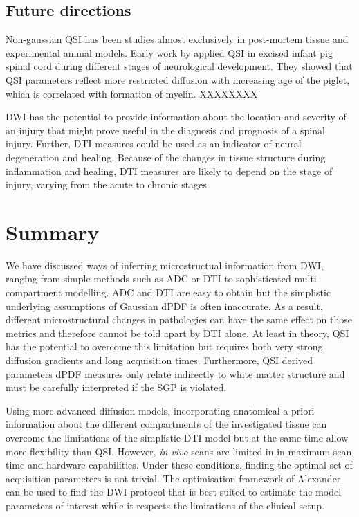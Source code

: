 \subsection{Future directions}
Non-gaussian \gls{QSI} has been studies almost exclusively in post-mortem tissue and experimental animal models. Early work by \citet{Assaf:2001} applied \gls{QSI} in excised infant pig spinal cord during different stages of neurological development. They showed that \gls{QSI} parameters reflect more restricted diffusion with increasing age of the piglet, which is correlated with formation of myelin. XXXXXXXX


\Gls{DWI} has the potential to  provide information about the location and severity of an injury that might prove useful in the diagnosis and prognosis of a spinal injury.  Further, DTI measures could be used as an indicator of neural degeneration and healing.  Because of the changes in tissue structure during inflammation and healing, DTI measures are likely to depend on the stage of injury, varying from the acute to chronic stages.  

 
\section{Summary}
We have discussed ways of inferring microstructual information from  {\gls{DWI}}, ranging from simple methods such as \gls{ADC} or \gls{DTI} to sophisticated multi-compartment modelling. \gls{ADC} and \gls{DTI} are easy to obtain but the simplistic underlying assumptions of Gaussian  {\gls{dPDF}} is often inaccurate. As a result, different microstructural changes in pathologies can have the same effect on those metrics and therefore cannot be told apart by \gls{DTI} alone. At least in theory, \gls{QSI} has the potential to overcome this limitation but requires both very strong diffusion gradients and long acquisition times. Furthermore, \gls{QSI} derived parameters  {\gls{dPDF}} measures only relate indirectly to white matter structure and must be carefully interpreted if the SGP is violated.


Using more advanced diffusion models, incorporating anatomical a-priori information about the different compartments of the investigated tissue can overcome the limitations of the simplistic \gls{DTI} model but at the same time allow more flexibility than \gls{QSI}. However, \emph{in-vivo} scans are limited in in maximum scan time and hardware capabilities. Under these conditions, finding the optimal set of acquisition parameters is not trivial. The optimisation framework of Alexander can be used to find the  {\gls{DWI}}  protocol that is best suited to estimate the model parameters of interest while it respects the limitations of the clinical setup.  
